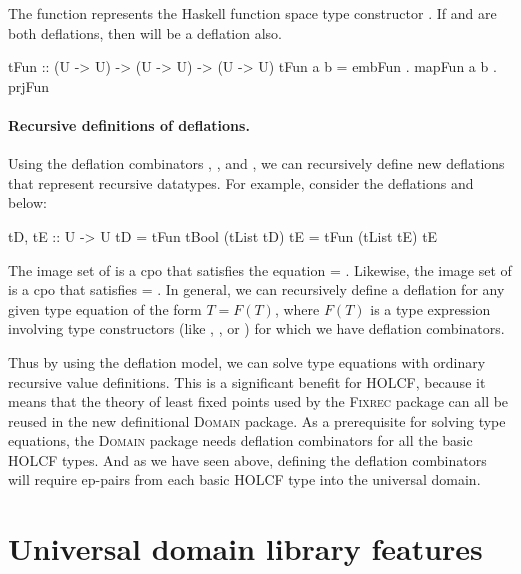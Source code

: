 The function  represents the Haskell function space type constructor \hs{(->)}. If  and  are both deflations, then  will be a deflation also.
%
\begin{hscode}
tFun :: (U -> U) -> (U -> U) -> (U -> U)
tFun a b = embFun . mapFun a b . prjFun
\end{hscode}
%
\paragraph{Recursive definitions of deflations.} Using the deflation combinators , , and , we can recursively define new deflations that represent recursive datatypes. For example, consider the deflations  and  below:
%
\begin{hscode}
tD, tE :: U -> U
tD = tFun tBool (tList tD)
tE = tFun (tList tE) tE
\end{hscode}
%
The image set of  is a cpo  that satisfies the equation  = . Likewise, the image set of  is a cpo  that satisfies  = . In general, we can recursively define a deflation for any given type equation of the form $T = F(T)$, where $F(T)$ is a type expression involving type constructors (like , \hs{[]}, or \hs{(->)}) for which we have deflation combinators.

Thus by using the deflation model, we can solve type equations with ordinary recursive value definitions. This is a significant benefit for HOLCF, because it means that the theory of least fixed points used by the \textsc{Fixrec} package can all be reused in the new definitional \textsc{Domain} package. As a prerequisite for solving type equations, the \textsc{Domain} package needs deflation combinators for all the basic HOLCF types. And as we have seen above, defining the deflation combinators will require ep-pairs from each basic HOLCF type into the universal domain.

\section{Universal domain library features}
\label{sec:universal-features}

